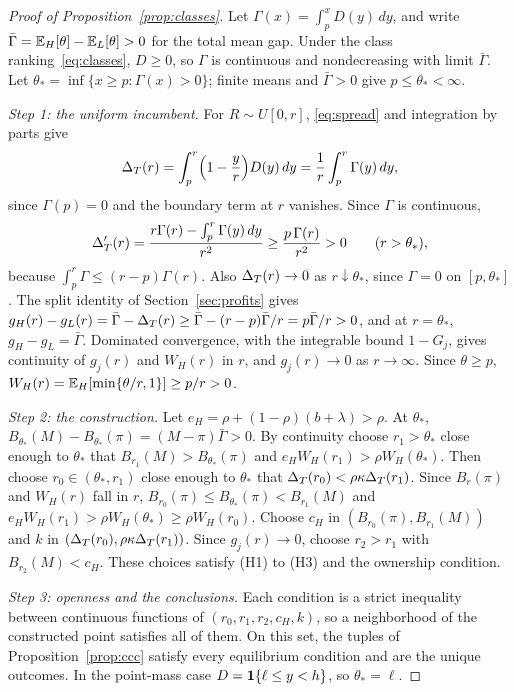 \begin{proof}[Proof of Proposition~\ref{prop:classes}]
Let \(\Gamma(x)=\int_p^xD(y)\,dy\), and write \(\bar\Gamma=\mathbb{E}_H[\theta]-\mathbb{E}_L[\theta]>0\) for the total mean gap. Under
the class ranking~\eqref{eq:classes}, \(D\ge0\), so \(\Gamma\) is continuous and nondecreasing with limit \(\bar\Gamma\).
Let \(\theta_*=\inf\{x\ge p:\Gamma(x)>0\}\); finite means and \(\bar\Gamma>0\) give \(p\le \theta_*<\infty\).

\emph{Step 1: the uniform incumbent.} For \(R\sim U[0,r]\), \eqref{eq:spread} and integration by parts give
\[
\Delta_T(r)=\int_p^r\Bigl(1-\frac yr\Bigr)D(y)\,dy=\frac1r\int_p^r\Gamma(y)\,dy ,
\]
since \(\Gamma(p)=0\) and the boundary term at \(r\) vanishes. Since \(\Gamma\) is continuous,
\[
\Delta_T'(r)=\frac{r\Gamma(r)-\int_p^r\Gamma(y)\,dy}{r^2}\ge\frac{p\,\Gamma(r)}{r^2}>0\qquad(r>\theta_*),
\]
because \(\int_p^r\Gamma\le(r-p)\Gamma(r)\). Also \(\Delta_T(r)\to0\) as \(r\downarrow \theta_*\), since \(\Gamma=0\) on
\([p,\theta_*]\). The split identity of Section~\ref{sec:profits} gives
\(g_H(r)-g_L(r)=\bar\Gamma-\Delta_T(r)\ge\bar\Gamma-(r-p)\bar\Gamma/r=p\bar\Gamma/r>0\), and at \(r=\theta_*\), \(g_H-g_L=\bar\Gamma\). Dominated
convergence, with the integrable bound \(1-G_j\), gives continuity of \(g_j(r)\) and \(W_H(r)\) in \(r\), and
\(g_j(r)\to0\) as \(r\to\infty\). Since \(\theta\ge p\), \(W_H(r)=\mathbb{E}_H[\min\{\theta/r,1\}]\ge p/r>0\).

\emph{Step 2: the construction.} Let \(e_H=\rho+(1-\rho)(b+\lambda)>\rho\). At \(\theta_*\),
\(B_{\theta_*}(M)-B_{\theta_*}(\pi)=(M-\pi)\bar\Gamma>0\). By continuity choose \(r_1>\theta_*\) close enough to \(\theta_*\) that
\(B_{r_1}(M)>B_{\theta_*}(\pi)\) and \(e_HW_H(r_1)>\rho W_H(\theta_*)\). Then choose \(r_0\in(\theta_*,r_1)\) close enough to
\(\theta_*\) that \(\Delta_T(r_0)<\rho\kappa\Delta_T(r_1)\). Since \(B_r(\pi)\) and \(W_H(r)\) fall in \(r\),
\(B_{r_0}(\pi)\le B_{\theta_*}(\pi)<B_{r_1}(M)\) and \(e_HW_H(r_1)>\rho W_H(\theta_*)\ge\rho W_H(r_0)\). Choose \(c_H\) in
\((B_{r_0}(\pi),B_{r_1}(M))\) and \(k\) in \((\Delta_T(r_0),\rho\kappa\Delta_T(r_1))\). Since \(g_j(r)\to0\), choose
\(r_2>r_1\) with \(B_{r_2}(M)<c_H\). These choices satisfy (H1) to (H3) and the ownership condition.

\emph{Step 3: openness and the conclusions.} Each condition is a strict inequality between continuous functions of
\((r_0,r_1,r_2,c_H,k)\), so a neighborhood of the constructed point satisfies all of them. On this set,
the tuples of Proposition~\ref{prop:ccc} satisfy every equilibrium condition and are the unique outcomes. In
the point-mass case \(D=\mathbf{1}\{\ell\le y<h\}\), so \(\theta_*=\ell\).
\end{proof}

